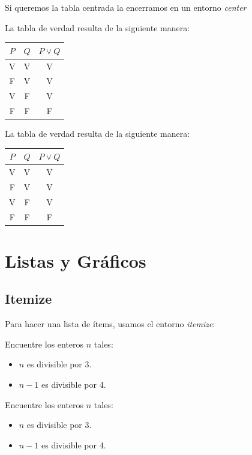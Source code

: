 \documentclass[graybox,envcountchap,sectrefs]{svmono}
\begin{document}
Si queremos la tabla centrada la encerramos en un entorno \emph{center}

\begin{code}
    La tabla de verdad resulta de la siguiente manera:
    \begin{center}
        \begin{tabular}{ccc}
            \toprule
            \(P\) & \(Q\) & \(P\vee Q\) \\
            \midrule
            V & V & V       \\
            F & V & V       \\
            V & F & V       \\
            F & F & F       \\
            \bottomrule
        \end{tabular}
    \end{center}
\end{code}
\begin{compiled}
    La tabla de verdad resulta de la siguiente manera:
    \begin{center}
        \begin{tabular}{ccc}
            \toprule
            \(P\) & \(Q\) & \(P\vee Q\) \\
            \midrule
            V & V & V       \\
            F & V & V       \\
            V & F & V       \\
            F & F & F       \\
            \bottomrule
        \end{tabular}
    \end{center}
\end{compiled}




\chapter{Listas y Gráficos}
\section{Itemize}
    Para hacer una lista de ítems, usamos el entorno \emph{itemize}:
    \begin{code}
        Encuentre los enteros \(n\) tales:
        \begin{itemize}
            \item \(n\) es divisible por 3.
            \item \(n-1\) es divisible por 4.
        \end{itemize}
    \end{code}
    \begin{compiled}
        Encuentre los enteros \(n\) tales:
        \begin{itemize}
            \item \(n\) es divisible por 3.
            \item \(n-1\) es divisible por 4.
        \end{itemize}
    \end{compiled}
\end{document}
